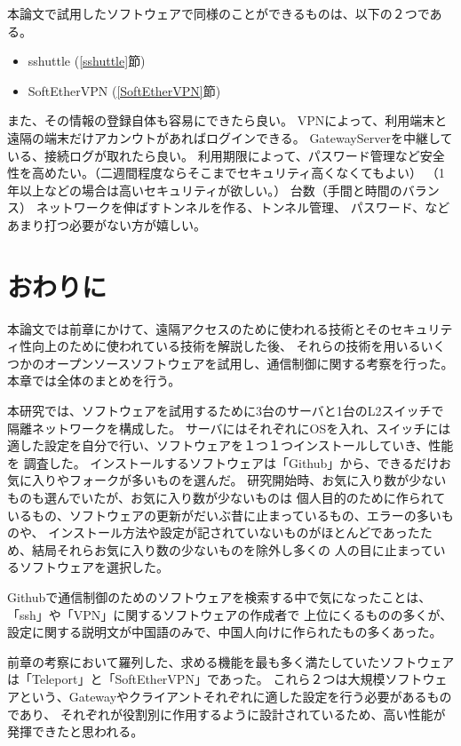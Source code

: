 \documentclass[11pt,a4j,titlepage]{jreport}
\begin{document}
\par 本論文で試用したソフトウェアで同様のことができるものは、以下の２つである。
\begin{itemize}
    \item sshuttle (\ref{sshuttle}節)
    \item SoftEtherVPN (\ref{SoftEtherVPN}節)
\end{itemize}\par

また、その情報の登録自体も容易にできたら良い。
VPNによって、利用端末と遠隔の端末だけアカンウトがあればログインできる。
GatewayServerを中継している、接続ログが取れたら良い。
利用期限によって、パスワード管理など安全性を高めたい。（二週間程度ならそこまでセキュリティ高くなくてもよい）
（1年以上などの場合は高いセキュリティが欲しい。）
台数（手間と時間のバランス）
ネットワークを伸ばすトンネルを作る、トンネル管理、
パスワード、などあまり打つ必要がない方が嬉しい。
\fi


\chapter{おわりに}
本論文では前章にかけて、遠隔アクセスのために使われる技術とそのセキュリティ性向上のために使われている技術を解説した後、
それらの技術を用いるいくつかのオープンソースソフトウェアを試用し、通信制御に関する考察を行った。
本章では全体のまとめを行う。\par
本研究では、ソフトウェアを試用するために3台のサーバと1台のL2スイッチで隔離ネットワークを構成した。
サーバにはそれぞれにOSを入れ、スイッチには適した設定を自分で行い、ソフトウェアを１つ１つインストールしていき、性能を
調査した。
インストールするソフトウェアは「Github」から、できるだけお気に入りやフォークが多いものを選んだ。
研究開始時、お気に入り数が少ないものも選んでいたが、お気に入り数が少ないものは
個人目的のために作られているもの、ソフトウェアの更新がだいぶ昔に止まっているもの、エラーの多いものや、
インストール方法や設定が記されていないものがほとんどであったため、結局それらお気に入り数の少ないものを除外し多くの
人の目に止まっているソフトウェアを選択した。

Githubで通信制御のためのソフトウェアを検索する中で気になったことは、「ssh」や「VPN」に関するソフトウェアの作成者で
上位にくるものの多くが、設定に関する説明文が中国語のみで、中国人向けに作られたもの多くあった。

\fi

前章の考察において羅列した、求める機能を最も多く満たしていたソフトウェアは「Teleport」と「SoftEtherVPN」であった。
これら２つは大規模ソフトウェアという、Gatewayやクライアントそれぞれに適した設定を行う必要があるものであり、
それぞれが役割別に作用するように設計されているため、高い性能が発揮できたと思われる。
\end{document}
